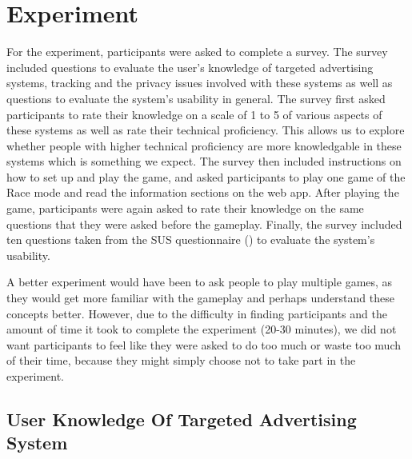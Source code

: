 \documentclass{l4proj}
\begin{document}
\section{Experiment}
For the experiment, participants were asked to complete a survey. The survey included questions to evaluate the user's knowledge of targeted advertising systems, tracking and the privacy issues involved with these systems as well as questions to evaluate the system's usability in general. The survey first asked participants to rate their knowledge on a scale of 1 to 5 of various aspects of these systems as well as rate their technical proficiency. This allows us to explore whether people with higher technical proficiency are more knowledgable in these systems which is something we expect. The survey then included instructions on how to set up and play the game, and asked participants to play one game of the Race mode and read the information sections on the web app. After playing the game, participants were again asked to rate their knowledge on the same questions that they were asked before the gameplay. Finally, the survey included ten questions taken from the SUS questionnaire (\cite{sus}) to evaluate the system's usability.

A better experiment would have been to ask people to play multiple games, as they would get more familiar with the gameplay and perhaps understand these concepts better. However, due to the difficulty in finding participants and the amount of time it took to complete the experiment (20-30 minutes), we did not want participants to feel like they were asked to do too much or waste too much of their time, because they might simply choose not to take part in the experiment.

\subsection{User Knowledge Of Targeted Advertising System}
\end{document}
